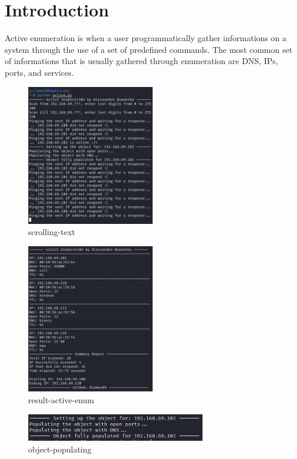 \section{Introduction}
\label{s:lab2-introduction}
Active enumeration is when a user programmatically gather informations on a system through
the use of a set of predefined commands. The most common set of informations that is
usually gathered through enumeration are DNS, IPs, ports, and services.

\begin{figure}[H]
  \centering
  \includegraphics[width=0.5\textwidth]{figures/scrolling-text}
  \caption{scrolling-text}
  \label{f:scrolling-text}
\end{figure}

\begin{figure}[H]
  \centering
  \includegraphics[width=0.5\textwidth]{figures/result-active-enum}
  \caption{result-active-enum}
  \label{f:result-active-enum}
\end{figure}

\begin{figure}[H]
  \centering
  \includegraphics[width=0.7\textwidth]{figures/object-populating}
  \caption{object-populating}
  \label{f:object-populating}
\end{figure}

